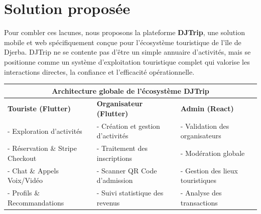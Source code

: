 \documentclass[12pt,a4paper]{report}
\begin{document}
\section{Solution proposée}
Pour combler ces lacunes, nous proposons la plateforme \textbf{DJTrip}, une solution mobile et web spécifiquement conçue pour l'écosystème touristique de l'île de Djerba. DJTrip ne se contente pas d'être un simple annuaire d'activités, mais se positionne comme un système d'exploitation touristique complet qui valorise les interactions directes, la confiance et l'efficacité opérationnelle.

\begin{table}[htbp]
\centering
\begin{tabularx}{\textwidth}{|X|X|X|}
\hline
\multicolumn{3}{|c|}{\textbf{Architecture globale de l'écosystème DJTrip}} \\
\hline
\textbf{Touriste (Flutter)} & \textbf{Organisateur (Flutter)} & \textbf{Admin (React)} \\
\hline
- Exploration d'activités & - Création et gestion d'activités & - Validation des organisateurs \\
- Réservation \& Stripe Checkout & - Traitement des inscriptions & - Modération globale \\
- Chat \& Appels Voix/Vidéo & - Scanner QR Code d'admission & - Gestion des lieux touristiques \\
- Profils \& Recommandations & - Suivi statistique des revenus & - Analyse des transactions \\
\hline
\end{tabularx}
\end{table}
\end{document}
